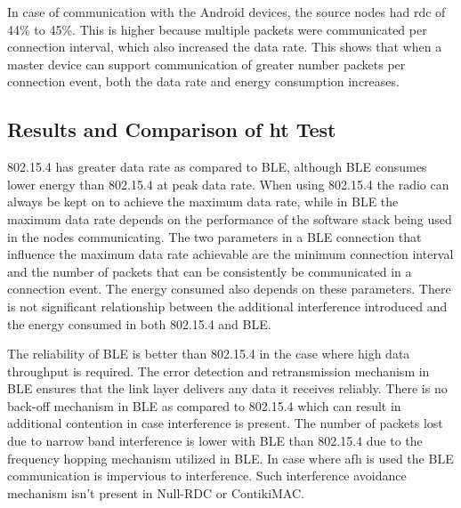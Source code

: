 In case of communication with the Android devices, the source nodes had \gls{rdc} of 44\% to 45\%. This is higher because multiple packets were communicated per connection interval, which also increased the data rate. This shows that when a master device can support communication of greater number packets per connection event, both the data rate and energy consumption increases.

%

\subsection{Results and Comparison of \texorpdfstring{\acrlong{ht}}{High-Throughput} Test}

802.15.4 has greater data rate as compared to BLE, although BLE consumes lower energy than 802.15.4 at peak data rate. When using 802.15.4 the radio can always be kept on to achieve the maximum data rate, while in BLE the maximum data rate depends on the performance of the software stack being used in the nodes communicating. The two parameters in a BLE connection that influence the maximum data rate  achievable are the minimum connection interval and the number of packets that can be consistently be communicated in a connection event. The energy consumed also depends on these parameters. There is not significant relationship between the additional interference introduced and the energy consumed in both 802.15.4 and BLE. 

The reliability of BLE is better than 802.15.4 in the case where high data throughput is required. The error detection and retransmission mechanism in BLE ensures that the link layer delivers any data it receives reliably. There is no back-off mechanism in BLE as compared to 802.15.4 which can result in additional contention in case interference is present. The number of packets lost due to narrow band interference is lower with BLE than 802.15.4 due to the frequency hopping mechanism utilized in BLE. In case where \gls{afh} is used the BLE communication is impervious to interference. Such interference avoidance mechanism isn't present in Null-RDC or ContikiMAC.

